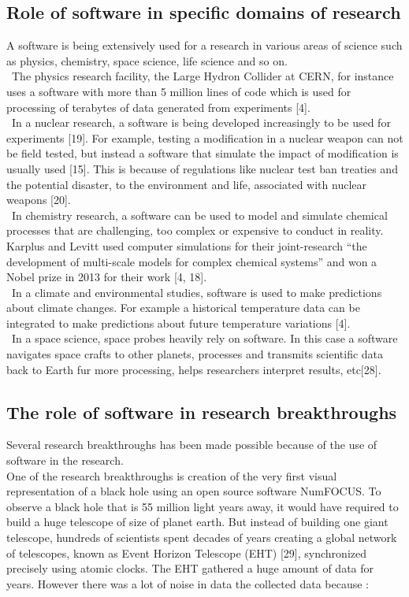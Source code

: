 \subsection{Role of software in specific domains of research }
A software is being extensively used for a research in various areas of science such as physics, chemistry, space science, life science and so on.\\\
The physics research facility, the Large Hydron Collider at CERN, for instance uses a software with more than 5 million lines of code which is used for processing of terabytes of data generated from experiments [4].\\\
In a nuclear research, a software is being developed increasingly to be used for experiments [19]. For example, testing a modification in a nuclear weapon can not be field tested, but instead a software that simulate the impact of modification is usually used [15]. This is because of regulations like nuclear test ban treaties and the potential disaster, to the environment and life, associated with nuclear weapons [20]. \\\
In chemistry research, a software can be used to model and simulate chemical processes that are challenging, too complex or expensive to conduct in reality. Karplus and Levitt used computer simulations for their joint-research “the development of multi-scale models for complex chemical systems”  and won a Nobel prize in 2013 for their work [4, 18].\\\
In a climate and environmental studies, software is used to make predictions about climate changes. For example a historical temperature data can be integrated to make predictions about future temperature variations [4].\\\
In a space science, space probes heavily rely on software. In this case a software navigates space crafts to other planets, processes and transmits scientific data back to Earth fur more processing, helps researchers interpret results, etc[28].
\subsection{The role of software in research breakthroughs}
Several research breakthroughs has been made possible because of the use of software in the research. \\
One of the research breakthroughs is creation of the very first visual representation of a black hole using an open source software NumFOCUS. To observe a black hole that is 55 million light years away, it would have required to build a huge telescope of size of planet earth. But instead of building one giant telescope, hundreds of scientists spent decades of years creating a global network of telescopes, known as Event Horizon Telescope (EHT) [29], synchronized precisely using atomic clocks. The EHT gathered a huge amount of data for years. However there was a lot of noise in data the collected data because :

